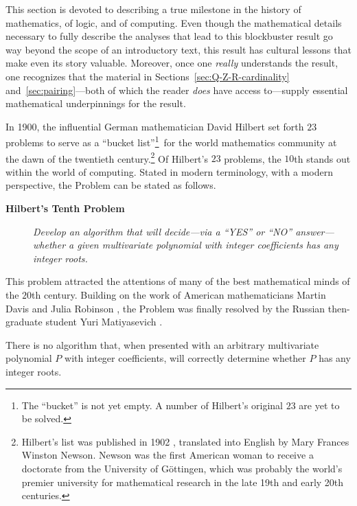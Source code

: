 This section is devoted to describing a true milestone in the history
of mathematics, of logic, and of computing.  Even though the
mathematical details necessary to fully describe the analyses that lead
to this blockbuster result go way beyond the scope of an introductory
text, this result has cultural lessons that make even its story
valuable.  Moreover, once one {\em really} understands the result, one
recognizes that the material in Sections~\ref{sec:Q-Z-R-cardinality}
and~\ref{sec:pairing}---both of which the reader {\em does} have
access to---supply essential mathematical underpinnings for the result.

In 1900, the influential German mathematician David Hilbert
 set forth $23$ problems to serve as a ``bucket
list''\footnote{The ``bucket'' is not yet empty.  A number of Hilbert's
  original $23$ are yet to be solved.}~for the world mathematics
community at the dawn of the twentieth century.\footnote{Hilbert's
  list was published in 1902 \cite{Hilbert02}, translated into English
  by Mary Frances Winston Newson. 
  Newson was the first American woman to receive a doctorate from the
  University of G\"{o}ttingen, which was probably the world's premier
  university for mathematical research in the late 19th and early 20th
  centuries.}  Of Hilbert's $23$ problems, the $10$th stands out
within the world of computing.  Stated
in modern terminology, with a modern perspective, the Problem can be
stated as follows.
\begin{description}
\item[{\bf Hilbert's Tenth Problem}]
{\it Develop an algorithm that will decide---via a ``YES'' or ``NO''
  answer---whether a given multivariate polynomial with integer
  coefficients has any integer roots.  }
\end{description}
This problem attracted the attentions of many of the best mathematical
minds of the $20$th century.  Building on the work of American
mathematicians Martin Davis  and Julia Robinson
, the Problem was finally resolved by the Russian
then-graduate student Yuri Matiyasevich .

\begin{theorem}
\label{thm:Hilberts-10th}
There is no algorithm that, when presented with an arbitrary
multivariate polynomial $P$ with integer coefficients, will correctly
determine whether $P$ has any integer roots.
\end{theorem}

